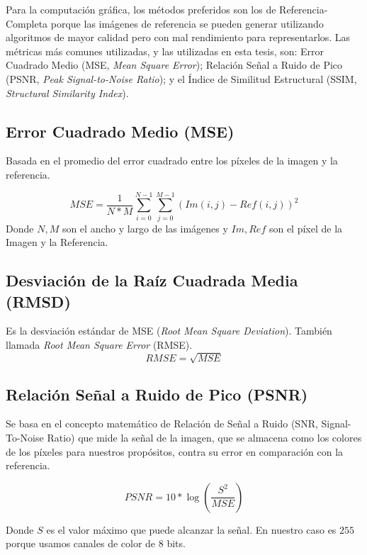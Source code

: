 \documentclass[pregrado]{tesis-usb} %
\begin{document}
Para la computación gráfica, los métodos preferidos son los de Referencia-Completa porque las imágenes de referencia se pueden generar utilizando algoritmos de mayor calidad pero con mal rendimiento para representarlos. Las métricas más comunes utilizadas, y las utilizadas en esta tesis, son: Error Cuadrado Medio (MSE, \textit{Mean Square Error}); Relación Señal a Ruido de Pico (PSNR, \textit{Peak Signal-to-Noise Ratio}); y el Índice de Similitud Estructural  (SSIM, \textit{Structural Similarity Index}).

\subsection{Error Cuadrado Medio (MSE)}
Basada en el promedio del error cuadrado entre los píxeles de la imagen y la referencia. 

\begin{equation}\label{eq:mse}
	MSE=\frac{1}{N*M}\sum\limits_{i=0}^{N-1}\sum\limits_{j=0}^{M-1}(Im(i,j)-Ref(i,j))^2
\end{equation}
Donde $N, M$ son el ancho y largo de las imágenes y $Im, Ref$ son el píxel de la Imagen y la Referencia.

\subsection{Desviación de la Raíz Cuadrada Media  (RMSD)}
Es la desviación estándar de MSE (\textit{Root Mean Square Deviation}). También llamada \textit{Root Mean Square Error} (RMSE).
\begin{equation}\label{eq:rmse}
RMSE=\sqrt{MSE}
\end{equation}

\subsection{Relación Señal a Ruido de Pico (PSNR)}
Se basa en el concepto matemático de Relación de Señal a Ruido (SNR, Signal-To-Noise Ratio) que mide la señal de la imagen, que se almacena como los colores de los píxeles para nuestros propósitos, contra su error en comparación con la referencia. \cite{Yusra2012}

\begin{equation}\label{eq:psnr}
PSNR=10*\log\left(\frac{S^2}{MSE}\right)
\end{equation}

Donde $S$ es el valor máximo que puede alcanzar la señal. En nuestro caso es $255$ porque usamos canales de color de 8 bits.
\end{document}
